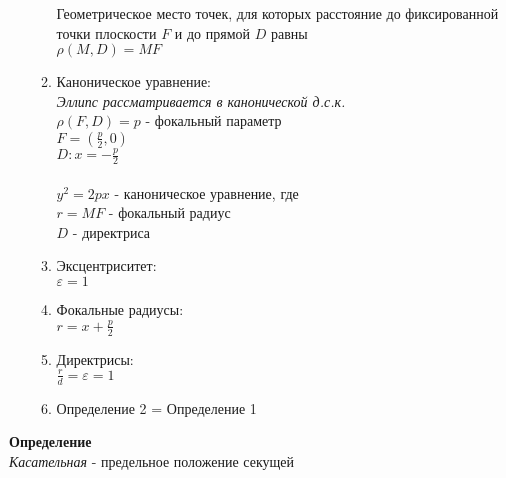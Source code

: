 \documentclass[12pt]{article}
\begin{document}
\begin{enumerate}
\begin{enumerate}
        Геометрическое место точек, для которых расстояние до фиксированной точки плоскости $F$ и до прямой $D$ равны\\
        $\rho(M,D)=MF$
        \item Каноническое уравнение:\\
        \textit{Эллипс рассматривается в канонической д.с.к.}\\
        $\rho(F,D) = p$ - фокальный параметр\\
        $F=(\frac p2,0)$\\
        $D: x=-\frac p2$\\\\
        $y^2=2px$ - каноническое уравнение, где\\
        $r=MF$ - фокальный радиус\\
        $D$ - директриса
        \item Эксцентриситет:\\
        $\varepsilon =  1$
        \item Фокальные радиусы:\\
        $r=x+\frac p2$
        \item Директрисы:\\
        $\frac rd = \varepsilon = 1$
        \item Определение 2 = Определение 1
    \end{enumerate}
\end{enumerate}
\textbf{Определение}\\
\textit{Касательная} - предельное положение секущей
\end{document}
